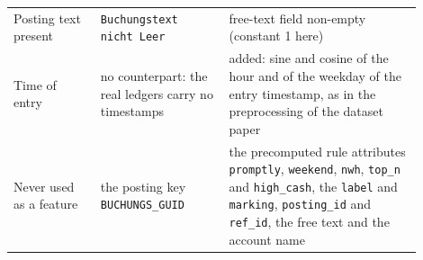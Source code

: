 \begin{table}[tbp]
\begin{tabular}{@{}>{\raggedright\arraybackslash}p{0.19\linewidth}>{\raggedright\arraybackslash}p{0.29\linewidth}>{\raggedright\arraybackslash}p{0.42\linewidth}@{}}
Posting text present & \texttt{Buchungstext nicht Leer} & free-text field non-empty (constant 1 here)  \\
Time of entry & no counterpart: the real ledgers carry no timestamps & added: sine and cosine of the hour and of the weekday of the entry timestamp, as in the preprocessing of the dataset paper  \\
Never used as a feature & the posting key \texttt{BUCHUNGS\_GUID} & the precomputed rule attributes \texttt{promptly}, \texttt{weekend}, \texttt{nwh}, \texttt{top\_n} and \texttt{high\_cash}, the \texttt{label} and \texttt{marking}, \texttt{posting\_id} and \texttt{ref\_id}, the free text and the account name  \\
\bottomrule
\end{tabular}
\end{table}

